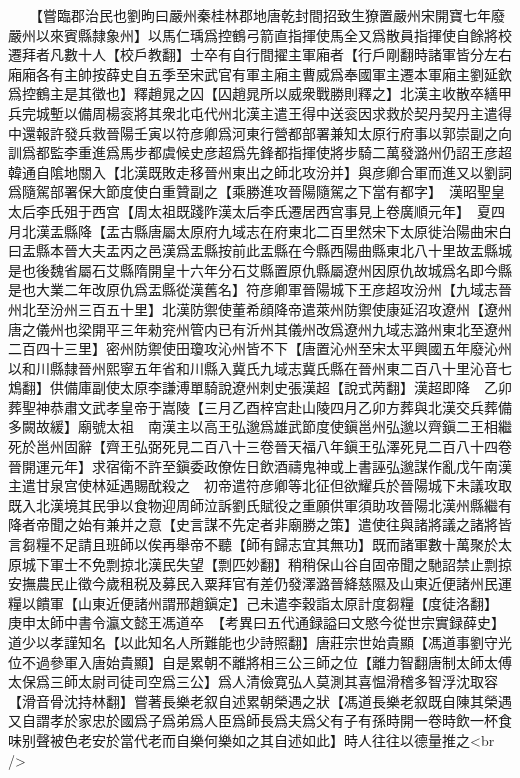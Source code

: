 　　【嘗臨郡治民也劉昫曰嚴州秦桂林郡地唐乾封間招致生獠置嚴州宋開寶七年廢嚴州以來賓縣隸象州】以馬仁瑀爲控鶴弓箭直指揮使馬全又爲散員指揮使自餘將校遷拜者凡數十人【校戶教翻】士卒有自行間擢主軍廂者【行戶剛翻時諸軍皆分左右廂廂各有主帥按薛史自五季至宋武官有軍主廂主曹威爲奉國軍主遷本軍廂主劉延欽爲控鶴主是其徵也】釋趙晁之囚【囚趙晁所以威衆戰勝則釋之】北漢主收散卒繕甲兵完城塹以備周楊衮將其衆北屯代州北漢主遣王得中送衮因求救於契丹契丹主遣得中還報許發兵救晉陽壬寅以符彦卿爲河東行營都部署兼知太原行府事以郭崇副之向訓爲都監李重進爲馬步都虞候史彦超爲先鋒都指揮使將步騎二萬發潞州仍詔王彦超韓通自隂地關入【北漢既敗走移晉州東出之師北攻汾并】與彦卿合軍而進又以劉詞爲隨駕部署保大節度使白重贊副之【乘勝進攻晉陽隨駕之下當有都字】　漢昭聖皇太后李氏殂于西宫【周太祖既踐阼漢太后李氏遷居西宫事見上卷廣順元年】　夏四月北漢盂縣降【盂古縣唐屬太原府九域志在府東北二百里然宋下太原徙治陽曲宋白曰盂縣本晉大夫盂丙之邑漢爲盂縣按前此盂縣在今縣西陽曲縣東北八十里故盂縣城是也後魏省屬石艾縣隋開皇十六年分石艾縣置原仇縣屬遼州因原仇故城爲名即今縣是也大業二年改原仇爲盂縣從漢舊名】符彦卿軍晉陽城下王彦超攻汾州【九域志晉州北至汾州三百五十里】北漢防禦使董希顔降帝遣萊州防禦使康延沼攻遼州【遼州唐之儀州也梁開平三年勑兖州管内已有沂州其儀州改爲遼州九域志潞州東北至遼州二百四十三里】密州防禦使田瓊攻沁州皆不下【唐置沁州至宋太平興國五年廢沁州以和川縣隸晉州熙寧五年省和川縣入冀氏九域志冀氏縣在晉州東二百八十里沁音七鴆翻】供備庫副使太原李謙溥單騎說遼州刺史張漢超【說式苪翻】漢超即降　乙卯葬聖神恭肅文武孝皇帝于嵩陵【三月乙酉梓宫赴山陵四月乙卯方葬與北漢交兵葬備多闕故緩】廟號太祖　南漢主以高王弘邈爲雄武節度使鎭邕州弘邈以齊鎭二王相繼死於邕州固辭【齊王弘弼死見二百八十三卷晉天福八年鎭王弘澤死見二百八十四卷晉開運元年】求宿衛不許至鎭委政僚佐日飲酒禱鬼神或上書誣弘邈謀作亂戊午南漢主遣甘泉宫使林延遇賜酖殺之　初帝遣符彦卿等北征但欲耀兵於晉陽城下未議攻取既入北漢境其民爭以食物迎周師泣訴劉氏賦役之重願供軍須助攻晉陽北漢州縣繼有降者帝聞之始有兼并之意【史言謀不先定者非廟勝之策】遣使往與諸將議之諸將皆言芻糧不足請且班師以俟再舉帝不聽【師有歸志宜其無功】既而諸軍數十萬聚於太原城下軍士不免剽掠北漢民失望【剽匹妙翻】稍稍保山谷自固帝聞之馳詔禁止剽掠安撫農民止徵今歲租税及募民入粟拜官有差仍發澤潞晉絳慈隰及山東近便諸州民運糧以饋軍【山東近便諸州謂邢趙鎭定】己未遣李穀詣太原計度芻糧【度徒洛翻】　庚申太師中書令瀛文懿王馮道卒　【考異曰五代通録謚曰文愍今從世宗實録薛史】道少以孝謹知名【以此知名人所難能也少詩照翻】唐莊宗世始貴顯【馮道事劉守光位不過參軍入唐始貴顯】自是累朝不離將相三公三師之位【離力智翻唐制太師太傅太保爲三師太尉司徒司空爲三公】爲人清儉寛弘人莫測其喜愠滑稽多智浮沈取容【滑音骨沈持林翻】嘗著長樂老叙自述累朝榮遇之狀【馮道長樂老叙既自陳其榮遇又自謂孝於家忠於國爲子爲弟爲人臣爲師長爲夫爲父有子有孫時開一卷時飲一杯食味别聲被色老安於當代老而自樂何樂如之其自述如此】時人往往以德量推之<br />
